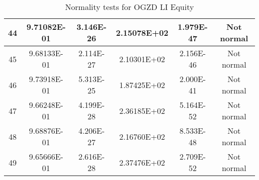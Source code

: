 \begin{table}[h]
\begin{tabular}{|c|c|c|c|c|c|}
		44 & 9.71082E-01 & 3.146E-26 & 2.15078E+02 & 1.979E-47 & Not normal\\\hline
		45 & 9.68133E-01 & 2.114E-27 & 2.10301E+02 & 2.156E-46 & Not normal\\\hline
		46 & 9.73918E-01 & 5.313E-25 & 1.87425E+02 & 2.000E-41 & Not normal\\\hline
		47 & 9.66248E-01 & 4.199E-28 & 2.36185E+02 & 5.164E-52 & Not normal\\\hline
		48 & 9.68876E-01 & 4.206E-27 & 2.16760E+02 & 8.533E-48 & Not normal\\\hline
		49 & 9.65666E-01 & 2.616E-28 & 2.37476E+02 & 2.709E-52 & Not normal\\\hline
	\end{tabular}
	\caption{Normality tests for OGZD LI Equity}
	\label{tab:normality_tests_OGZD_LI}
\end{table}
